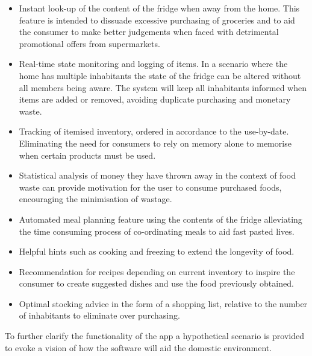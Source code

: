 \documentclass[a4paper, 11pt]{article}
\begin{document}
\begin{itemize}
  \item Instant look-up of the content of the fridge when away from the home. This feature is intended to dissuade excessive purchasing of groceries and to aid the consumer to make better judgements when faced with detrimental promotional offers from supermarkets.
  
  \item Real-time state monitoring and logging of items. In a scenario where the home has multiple inhabitants the state of the fridge can be altered without all members being aware. The system will keep all inhabitants informed when items are added or removed, avoiding duplicate purchasing and monetary waste.
  
  \item Tracking of itemised inventory, ordered in accordance to the use-by-date. Eliminating the need for consumers to rely on memory alone to memorise when certain products must be used.
  
  \item Statistical analysis of money they have thrown away in the context of food waste can provide motivation for the user to consume purchased foods, encouraging the minimisation of wastage.
   
   \item Automated meal planning feature using the contents of the fridge alleviating the time consuming process of co-ordinating meals to aid fast pasted lives.
    
   \item Helpful hints such as cooking and freezing to extend the longevity of food. 
   
   \item Recommendation for recipes depending on current inventory to inspire the consumer to create suggested dishes and use the food previously obtained. 

   \item Optimal stocking advice in the form of a shopping list, relative to the number of inhabitants to eliminate over purchasing. 
\end{itemize}

To further clarify the functionality of the app a hypothetical scenario is provided to evoke a vision of how the software will aid the domestic environment. 
\end{document}
